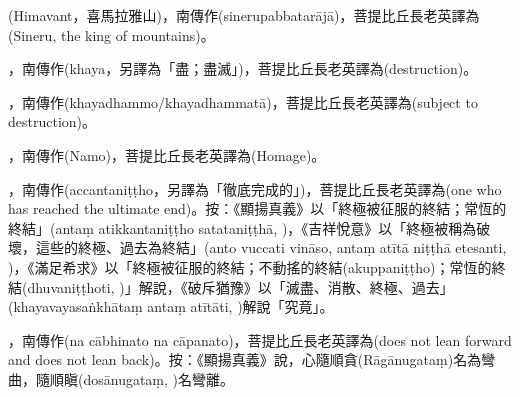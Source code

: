 \startitemgroup[noteitems]
\item{}(Himavant，喜馬拉雅山)，南傳作(sinerupabbatarājā)，菩提比丘長老英譯為(Sineru, the king of mountains)。
\stopitemgroup

\startitemgroup[noteitems]
\item{}，南傳作(khaya，另譯為「盡；盡滅」)，菩提比丘長老英譯為(destruction)。
\item{}，南傳作(khayadhammo/khayadhammatā)，菩提比丘長老英譯為(subject to destruction)。
\stopitemgroup

\startitemgroup[noteitems]
\item{}，南傳作(Namo)，菩提比丘長老英譯為(Homage)。
\stopitemgroup

\startitemgroup[noteitems]
\item{}，南傳作(accantaniṭṭho，另譯為「徹底完成的」)，菩提比丘長老英譯為(one who has reached the ultimate end)。按：《顯揚真義》以「終極被征服的終結；常恆的終結」(antaṃ atikkantaniṭṭho satataniṭṭhā, )，《吉祥悅意》以「終極被稱為破壞，這些的終極、過去為終結」(anto vuccati vināso, antaṃ atītā niṭṭhā etesanti, )，《滿足希求》以「終極被征服的終結；不動搖的終結(akuppaniṭṭho)；常恆的終結(dhuvaniṭṭhoti, )」解說，《破斥猶豫》以「滅盡、消散、終極、過去」(khayavayasaṅkhātaṃ antaṃ atītāti, )解說「究竟」。
\stopitemgroup

\startitemgroup[noteitems]
\item{}，南傳作(na cābhinato na cāpanato)，菩提比丘長老英譯為(does not lean forward and does not lean back)。按：《顯揚真義》說，心隨順貪(Rāgānugataṃ)名為彎曲，隨順瞋(dosānugataṃ, )名彎離。
\stopitemgroup

